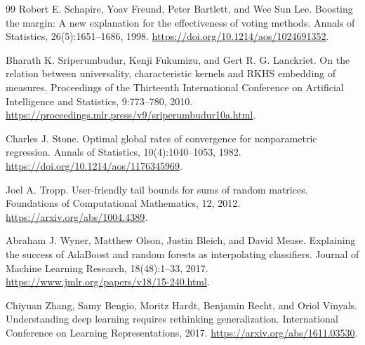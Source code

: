 \documentclass[11pt,twoside]{article}
\theoremstyle{definition}
\theoremstyle{remark}
\begin{document}
\begin{thebibliography}{99}
Robert E. Schapire, Yoav Freund, Peter Bartlett, and Wee Sun Lee.
\newblock Boosting the margin: A new explanation for the effectiveness of
voting methods.
\newblock Annals of Statistics, 26(5):1651--1686, 1998.
\newblock \url{https://doi.org/10.1214/aos/1024691352}.

Bharath K. Sriperumbudur, Kenji Fukumizu, and Gert R. G. Lanckriet.
\newblock On the relation between universality, characteristic kernels and
RKHS embedding of measures.
\newblock Proceedings of the Thirteenth International Conference on
Artificial Intelligence and Statistics, 9:773--780, 2010.
\newblock \url{https://proceedings.mlr.press/v9/sriperumbudur10a.html}.

Charles J. Stone.
\newblock Optimal global rates of convergence for nonparametric regression.
\newblock Annals of Statistics, 10(4):1040--1053, 1982.
\newblock \url{https://doi.org/10.1214/aos/1176345969}.

Joel A. Tropp.
\newblock User-friendly tail bounds for sums of random matrices.
\newblock Foundations of Computational Mathematics, 12, 2012.
\newblock \url{https://arxiv.org/abs/1004.4389}.

Abraham J. Wyner, Matthew Olson, Justin Bleich, and David Mease.
\newblock Explaining the success of AdaBoost and random forests as
interpolating classifiers.
\newblock Journal of Machine Learning Research, 18(48):1--33, 2017.
\newblock \url{https://www.jmlr.org/papers/v18/15-240.html}.

Chiyuan Zhang, Samy Bengio, Moritz Hardt, Benjamin Recht, and Oriol Vinyals.
\newblock Understanding deep learning requires rethinking generalization.
\newblock International Conference on Learning Representations, 2017.
\newblock \url{https://arxiv.org/abs/1611.03530}.

\end{thebibliography}
\end{document}
